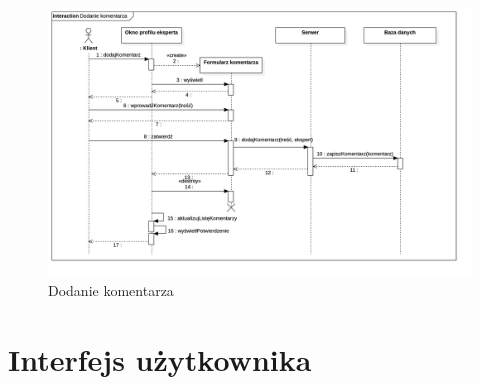 \documentclass[10pt, titlepage, oneside, a4paper]{article}
\begin{document}
	\begin{figure}[!htbp]
		\centering
		\includegraphics[width=\textwidth{}]{Dodanie_komentarza.png}
		\caption{Dodanie komentarza}
		\label{fig:sequenceDiagramAddComment}
	\end{figure}
	\newpage  
  
	\section{Interfejs użytkownika}
  
\end{document}
